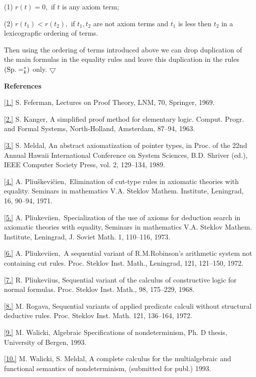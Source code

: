 (1) $r(t)=0,$ if $t$ is any axiom term;

(2) $r(t_1)<r(t_2),$ if $t_1, t_2$ are not axiom terms and $t_1$ is less
then $t_2$
in a lexicograpfic ordering  of terms.

Then using the ordering of terms introduced above we can
drop duplication of the main formulas in the equality rules  and leave this
duplication  in the rules $(\sp =^\ast_k)$ only.
 $\bigtriangledown$
\def\refa#1#2{\parindent=0.4cm\item{#1}{#2}\noindent\hang}
\bigskip

\centerline{\bf References}
\medskip

\ref {1.} {S. Feferman, Lectures on Proof Theory, LNM, 70, Springer, 1969.}

\ref {2.} {S. Kanger, A simplified proof method for elementary logic.
Comput. Progr. and  Formal Systems, North-Holland, Amsterdam,  87--94, 1963.}

\ref {3.} {S. Meldal, An abstract axiomatization of pointer types,
in Proc. of the 22nd Annual Hawaii International Conference on
System Sciences, B.D. Shriver (ed.), IEEE Computer Society Press, vol. 2,
129--134, 1989.}

\ref {4.} {A. Pliu\v skevi\v cien\e ,\ Elimination of cut-type rules in
axiomatic theories with equality. Seminars in mathematics V.A. Steklov Mathem.
Institute, Leningrad, 16,  90--94, 1971.}

\ref {5.} {A. Pliu\s kevi\cv ien\e ,\ Specialization of the use of axioms
for deduction
search in axiomatic theories with equality, Seminars in mathematics
V.A. Steklov Mathem. Institute, Leningrad, J. Soviet Math.  1,  110--116, 1973.}

\ref {6.} {A. Pliu\s kevi\cv ien\e ,\ A sequential variant of R.M.Robinson's
arithmetic system not  containing  cut rules. Proc.  Steklov  Inst. Math.,
Leningrad,
 121,  121--150, 1972.}

\ref {7.} {R. Pliu\s kevi\cv ius, Sequential variant of the calculus of
constructive logic
for normal formulas. Proc. Steklov Inst. Math., 98,  175--229, 1968.}

\ref {8.} {M. Rogava, Sequential variants of applied predicate calculi without
structural deductive rules. Proc. Steklov Inst. Math. 121,  136--164, 1972.}

\ref {9.} {M. Walicki,  Algebraic Specifications of nondeterminism,
Ph. D thesis, University of Bergen, 1993.}

\ref {10.} {M. Walicki, S. Meldal, A complete calculus for the
multialgebraic and functional semantics of nondeterminism,
(submitted for publ.) 1993.}

\bye






